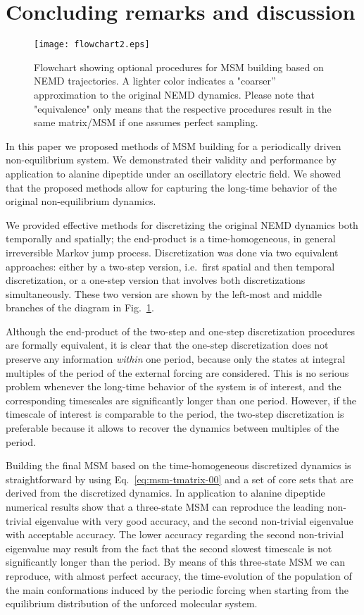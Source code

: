 \documentclass[journal=jctcce,manuscript=article]{achemso}
\begin{document}
\section{Concluding remarks and discussion}
\label{sec:conclusion}

\begin{figure}
  \centering
  \texttt{[image: flowchart2.eps]}
  \caption{Flowchart showing optional procedures for MSM building based on NEMD trajectories. A lighter color indicates
  a "coarser'' approximation to the original NEMD dynamics. Please note that "equivalence" only means that the respective procedures result in the same matrix/MSM if one assumes perfect sampling.}
  \label{fig:flowchart}
\end{figure}

In this paper we proposed methods of MSM building for a periodically driven
non-equilibrium system. We demonstrated their validity and performance by application to  alanine dipeptide under an oscillatory electric field. We showed that the proposed 
methods allow for capturing the long-time behavior of the original
non-equilibrium dynamics.

We provided effective methods for discretizing the original NEMD dynamics
both temporally and spatially; the end-product is a time-homogeneous, in general irreversible Markov jump process.
Discretization was done via two equivalent approaches:
either by a two-step version,
i.e.~first spatial and then temporal discretization,
or a one-step version that involves both discretizations simultaneously.
These two version are shown by the left-most and middle branches of the diagram  in Fig.~\ref{fig:flowchart}.

Although the end-product of the two-step and one-step discretization procedures are formally equivalent,
it is clear that the one-step discretization does not preserve any information
\emph{within} one period, because only the states
at integral multiples of the period of the external forcing are considered. This is no serious problem
whenever the long-time behavior of the system is of interest, and
the corresponding timescales are significantly longer than one
period. However, if the timescale of interest 
is comparable to the period, the two-step
discretization is preferable because it allows to recover the dynamics between multiples of
the period. 

Building the final MSM based on the time-homogeneous discretized dynamics is straightforward by
using Eq.~\eqref{eq:msm-tmatrix-00} and a set of core sets that are
derived from the discretized dynamics.  In application to alanine dipeptide numerical
results show that a three-state MSM can reproduce the leading non-trivial
eigenvalue with very good accuracy, and the second non-trivial
eigenvalue with acceptable accuracy. The lower accuracy regarding the
second non-trivial eigenvalue may result from the fact that the second
slowest timescale is not significantly longer than the period. By means of
this three-state MSM we can reproduce, with almost perfect
accuracy, the time-evolution of the population of the main conformations induced by the periodic forcing when starting from the  
equilibrium distribution of the unforced molecular system.
\end{document}
